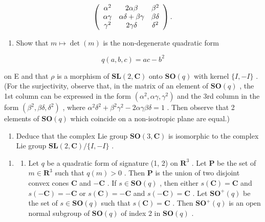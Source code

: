 \[
\left( \begin{array}{c c c} \alpha^ {2} & 2 \alpha \beta & \beta^ {2} \\ \alpha \gamma & \alpha \delta + \beta \gamma & \beta \delta \\ \gamma^ {2} & 2 \gamma \delta & \delta^ {2} \end{array} \right).
\]

\begin{enumerate}
\def\labelenumi{(\alph{enumi})}
\setcounter{enumi}{1}
\tightlist
\item
  Show that \(m \mapsto \det(m)\) is the non-degenerate quadratic form
\end{enumerate}

\[
q (a, b, c) = a c - b ^ {2}
\]

on E and that \(\rho\) is a morphism of \(\mathbf{SL}(2,\mathbf{C})\) onto \(\mathbf{SO}(q)\) with kernel \(\{I, - I\}\) . (For the surjectivity, observe that, in the matrix of an element of \(\mathbf{SO}(q)\) , the 1st column can be expressed in the form \((\alpha^2,\alpha \gamma ,\gamma^2)\) and the 3rd column in the form \((\beta^2,\beta \delta ,\delta^2)\) , where \(\alpha^2\delta^2 +\beta^2\gamma^2 -2\alpha \gamma \beta \delta = 1\) . Then observe that 2 elements of \(\mathbf{SO}(q)\) which coincide on a non-isotropic plane are equal.)

\begin{enumerate}
\def\labelenumi{(\alph{enumi})}
\setcounter{enumi}{2}
\tightlist
\item
  Deduce that the complex Lie group \(\mathbf{SO}(3, \mathbf{C})\) is isomorphic to the complex Lie group \(\mathbf{SL}(2, \mathbf{C}) / \{I, -I\}\) .
\end{enumerate}

\begin{enumerate}
\def\labelenumi{\arabic{enumi}.}
\setcounter{enumi}{3}
\tightlist
\item
  \begin{enumerate}
  \def\labelenumii{(\alph{enumii})}
  \tightlist
  \item
    Let \(q\) be a quadratic form of signature (1, 2) on \(\mathbf{R}^3\) . Let \(\mathbf{P}\) be the set of \(m \in \mathbf{R}^3\) such that \(q(m) > 0\) . Then \(\mathbf{P}\) is the union of two disjoint convex cones \(\mathbf{C}\) and \(-\mathbf{C}\) . If \(s \in \mathbf{SO}(q)\) , then either \(s(\mathbf{C}) = \mathbf{C}\) and \(s(-\mathbf{C}) = -\mathbf{C}\) or \(s(\mathbf{C}) = -\mathbf{C}\) and \(s(-\mathbf{C}) = \mathbf{C}\) . Let \(\mathbf{SO}^{+}(q)\) be the set of \(s \in \mathbf{SO}(q)\) such that \(s(\mathbf{C}) = \mathbf{C}\) . Then \(\mathbf{SO}^{+}(q)\) is an open normal subgroup of \(\mathbf{SO}(q)\) of index 2 in \(\mathbf{SO}(q)\) .
  \end{enumerate}
\end{enumerate}

